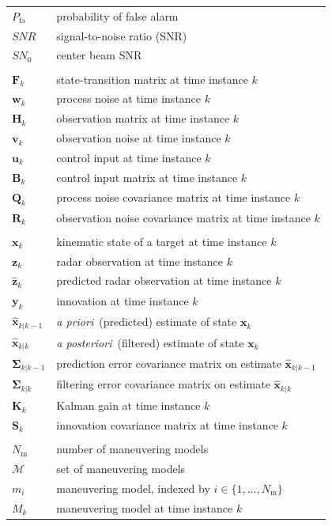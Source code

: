 \documentclass[english, 12pt, a4paper, elec, utf8, a-1b, online]{aaltothesis}
\renewcommand{\vec}[1]{\mathbf{#1}}
\newcommand{\xprior}{\hat{\vec{x}}_{k|k-1}}
\newcommand{\xpost}{\hat{\vec{x}}_{k|k}}
\newcommand{\priorecov}{\boldsymbol{\Sigma}_{k|k-1}}
\newcommand{\postecov}{\boldsymbol{\Sigma}_{k|k}}
\newcommand{\prefitinnov}{\vec{y}_k}
\newcommand{\x}{\vec{x}_k}
\newcommand{\z}{\vec{z}_k}
\newcommand{\stmodel}{\vec{F}_k}
\newcommand{\cimodel}{\vec{B}_k}
\newcommand{\cinput}{\vec{u}_k}
\newcommand{\pnoise}{\vec{w}_k}
\newcommand{\omodel}{\vec{H}_k}
\newcommand{\onoise}{\vec{v}_k}
\newcommand{\ocov}{\vec{R}_k}
\newcommand{\pcov}{\vec{Q}_k}
\newcommand{\innocov}{\vec{S}_k}
\newcommand{\gain}{\vec{K}_k}
\def\prior{\textit{a priori}\ }
\def\post{\textit{a posteriori}\ }
\newcommand{\zhat}{\hat{\vec{z}}_k}
\newcommand{\mimm}{\mathcal{M}}
\newcommand{\nmodels}{{N_\text{m}}}
\begin{document}
\begin{longtable}{ll}
$P_\text{fa}$ & probability of false alarm \\
$SNR$ & signal-to-noise ratio (SNR) \\
$SN_0$ & center beam SNR \\
&\\
$\stmodel$ & state-transition matrix at time instance $k$\\
$\pnoise$ & process noise at time instance $k$\\
$\omodel$ & observation matrix at time instance $k$\\
$\onoise$ & observation noise at time instance $k$\\
$\cinput$ & control input at time instance $k$\\
$\cimodel$ & control input matrix at time instance $k$\\
$\pcov$ & process noise covariance matrix at time instance $k$\\
$\ocov$ & observation noise covariance matrix at time instance $k$\\
&\\
$\x$ & kinematic state of a target at time instance $k$ \\
$\z$ & radar observation at time instance $k$ \\
$\zhat$ & predicted radar observation at time instance $k$ \\
$\prefitinnov$ & innovation at time instance $k$ \\
$\xprior$ & \prior (predicted) estimate of state $\x$\\
$\xpost$ & \post (filtered) estimate of state $\x$ \\
$\priorecov$ & prediction error covariance matrix on estimate $\xprior$ \\
$\postecov$ & filtering error covariance matrix on estimate $\xpost$ \\
$\gain$ & Kalman gain at time instance $k$ \\
$\innocov$ & innovation covariance matrix at time instance $k$ \\
&\\
$\nmodels$ & number of maneuvering models \\
$\mimm$ & set of maneuvering models \\
$m_i$ & maneuvering model, indexed by $i \in \{1, ..., \nmodels\}$ \\
$M_k$ & maneuvering model at time instance $k$ \\

\end{longtable}
\end{document}

